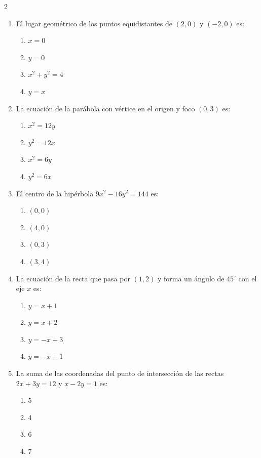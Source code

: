 \documentclass[10pt]{article}
\begin{document}
\begin{multicols}{2}
\begin{enumerate}
\item El lugar geométrico de los puntos equidistantes de $(2,0)$ y $(-2,0)$ es:
\begin{enumerate}[label=(\alph*)]
\item $x=0$
\item $y=0$
\item $x^2+y^2=4$
\item $y=x$
\end{enumerate}

\item La ecuación de la parábola con vértice en el origen y foco $(0,3)$ es:
\begin{enumerate}[label=(\alph*)]
\item $x^2 = 12y$
\item $y^2 = 12x$
\item $x^2 = 6y$
\item $y^2 = 6x$
\end{enumerate}

\item El centro de la hipérbola $9x^2 - 16y^2 = 144$ es:
\begin{enumerate}[label=(\alph*)]
\item $(0,0)$
\item $(4,0)$
\item $(0,3)$
\item $(3,4)$
\end{enumerate}

\item La ecuación de la recta que pasa por $(1,2)$ y forma un ángulo de $45^\circ$ con el eje $x$ es:
\begin{enumerate}[label=(\alph*)]
\item $y = x + 1$
\item $y = x + 2$
\item $y = -x + 3$
\item $y = -x + 1$
\end{enumerate}

\item La suma de las coordenadas del punto de intersección de las rectas $2x+3y=12$ y $x-2y=1$ es:
\begin{enumerate}[label=(\alph*)]
\item $5$
\item $4$
\item $6$
\item $7$
\end{enumerate}

\end{enumerate}
\end{multicols}
\end{document}
